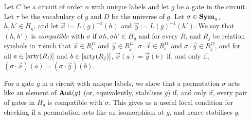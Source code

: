 \documentclass[../paper.tex]{subfiles}
\begin{document}




\begin{definition}
  Let $C$ be a circuit of order $n$ with unique labels and let $g$ be a gate in
  the circuit. Let $\tau$ be the vocabulary of $g$ and $D$ be the universe of
  $g$. Let $\sigma \in \text{\textbf{Sym}}_n$, $h, h' \in H_g$, and let $\vec{x} :=
  L(g)^{-1}(h)$ and $\vec{y} := L(g)^{-1}(h')$. We say that $(h, h')$ is
  \emph{compatible} with $\sigma$ if $\sigma h, \sigma h' \in H_g$ and for every
  $R_i$ and $R_j$ be relation symbols in $\tau$ such that $\vec{x} \in R^{D}_i$
  and $\vec{y} \in R^{D}_j$, $\sigma \cdot \vec{x} \in R^{D}_i$ and $\sigma
  \cdot \vec{y} \in R^D_j$, and for all $a \in [\mathrm{arty}(R_i)]$ and $b \in
  [\mathrm{arty}(R_j)]$, $\vec{x}(a) = \vec{y}(b)$ if, and only if, $(\sigma \cdot
  \vec{x})(a) = (\sigma \cdot \vec{y})(b)$.
\end{definition}


For a gate $g$ in a circuit with unique labels, we show that a permutation
$\sigma$ acts like an element of $\text{\textbf{Aut}}(g)$ (or, equivalently, stabilises $g$)
if, and only if, every pair of gates in $H_g$ is compatible with $\sigma$. This
gives us a useful local condition for checking if a permutation acts like an
isomorphism at $g$, and hence stabilises $g$.
\end{document}
